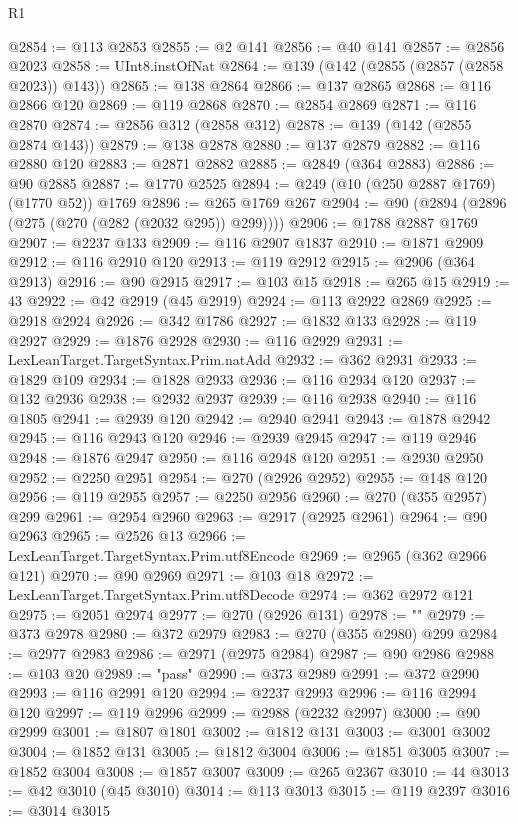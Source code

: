 \begin{lexlean}{R1}
\begin{coremodule}
@2854 := @113 @2853
@2855 := @2 @141
@2856 := @40 @141
@2857 := @2856 @2023
@2858 := UInt8.instOfNat
@2864 := @139 (@142 (@2855 (@2857 (@2858 @2023)) @143))
@2865 := @138 @2864
@2866 := @137 @2865
@2868 := @116 @2866 @120
@2869 := @119 @2868
@2870 := @2854 @2869
@2871 := @116 @2870
@2874 := @2856 @312 (@2858 @312)
@2878 := @139 (@142 (@2855 @2874 @143))
@2879 := @138 @2878
@2880 := @137 @2879
@2882 := @116 @2880 @120
@2883 := @2871 @2882
@2885 := @2849 (@364 @2883)
@2886 := @90 @2885
@2887 := @1770 @2525
@2894 := @249 (@10 (@250 @2887 @1769) (@1770 @52)) @1769
@2896 := @265 @1769 @267
@2904 := @90 (@2894 (@2896 (@275 (@270 (@282 (@2032 @295)) @299))))
@2906 := @1788 @2887 @1769
@2907 := @2237 @133
@2909 := @116 @2907 @1837
@2910 := @1871 @2909
@2912 := @116 @2910 @120
@2913 := @119 @2912
@2915 := @2906 (@364 @2913)
@2916 := @90 @2915
@2917 := @103 @15
@2918 := @265 @15
@2919 := 43
@2922 := @42 @2919 (@45 @2919)
@2924 := @113 @2922 @2869
@2925 := @2918 @2924
@2926 := @342 @1786
@2927 := @1832 @133
@2928 := @119 @2927
@2929 := @1876 @2928
@2930 := @116 @2929
@2931 := LexLeanTarget.TargetSyntax.Prim.natAdd
@2932 := @362 @2931
@2933 := @1829 @109
@2934 := @1828 @2933
@2936 := @116 @2934 @120
@2937 := @132 @2936
@2938 := @2932 @2937
@2939 := @116 @2938
@2940 := @116 @1805
@2941 := @2939 @120
@2942 := @2940 @2941
@2943 := @1878 @2942
@2945 := @116 @2943 @120
@2946 := @2939 @2945
@2947 := @119 @2946
@2948 := @1876 @2947
@2950 := @116 @2948 @120
@2951 := @2930 @2950
@2952 := @2250 @2951
@2954 := @270 (@2926 @2952)
@2955 := @148 @120
@2956 := @119 @2955
@2957 := @2250 @2956
@2960 := @270 (@355 @2957) @299
@2961 := @2954 @2960
@2963 := @2917 (@2925 @2961)
@2964 := @90 @2963
@2965 := @2526 @13
@2966 := LexLeanTarget.TargetSyntax.Prim.utf8Encode
@2969 := @2965 (@362 @2966 @121)
@2970 := @90 @2969
@2971 := @103 @18
@2972 := LexLeanTarget.TargetSyntax.Prim.utf8Decode
@2974 := @362 @2972 @121
@2975 := @2051 @2974
@2977 := @270 (@2926 @131)
@2978 := ""
@2979 := @373 @2978
@2980 := @372 @2979
@2983 := @270 (@355 @2980) @299
@2984 := @2977 @2983
@2986 := @2971 (@2975 @2984)
@2987 := @90 @2986
@2988 := @103 @20
@2989 := "pass"
@2990 := @373 @2989
@2991 := @372 @2990
@2993 := @116 @2991 @120
@2994 := @2237 @2993
@2996 := @116 @2994 @120
@2997 := @119 @2996
@2999 := @2988 (@2232 @2997)
@3000 := @90 @2999
@3001 := @1807 @1801
@3002 := @1812 @131
@3003 := @3001 @3002
@3004 := @1852 @131
@3005 := @1812 @3004
@3006 := @1851 @3005
@3007 := @1852 @3004
@3008 := @1857 @3007
@3009 := @265 @2367
@3010 := 44
@3013 := @42 @3010 (@45 @3010)
@3014 := @113 @3013
@3015 := @119 @2397
@3016 := @3014 @3015

\end{coremodule}
\end{lexlean}
